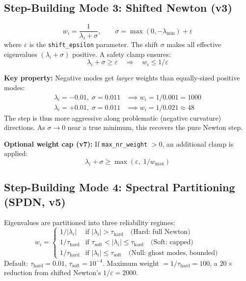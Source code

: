 \documentclass[11pt,a4paper]{article}
\newcommand{\eval}{\lambda}
\begin{document}
\subsection{Step-Building Mode 3: Shifted Newton (v3)}
\label{sec:shifted-newton}

\begin{equation}
  w_i = \frac{1}{\eval_i + \sigma}, \qquad \sigma = \max(0, -\eval_\text{min}) + \varepsilon
  \label{eq:shifted-newton}
\end{equation}
where $\varepsilon$ is the \texttt{shift\_epsilon} parameter. The shift $\sigma$ makes all effective eigenvalues $(\eval_i + \sigma)$ positive. A safety clamp ensures:
\begin{equation}
  \eval_i + \sigma \geq \varepsilon \quad \Rightarrow \quad w_i \leq 1/\varepsilon
\end{equation}

\textbf{Key property:} Negative modes get \emph{larger} weights than equally-sized positive modes:
\begin{align}
  \eval_i = -0.01,\; \sigma = 0.011 &\implies w_i = 1/0.001 = 1000 \\
  \eval_i = +0.01,\; \sigma = 0.011 &\implies w_i = 1/0.021 \approx 48
\end{align}
The step is thus more aggressive along problematic (negative curvature) directions. As $\sigma \to 0$ near a true minimum, this recovers the pure Newton step.

\textbf{Optional weight cap (v7):} If \texttt{max\_nr\_weight} $> 0$, an additional clamp is applied:
\begin{equation}
  \eval_i + \sigma \geq \max\left(\varepsilon,\; 1/w_\text{max}\right)
\end{equation}

\subsection{Step-Building Mode 4: Spectral Partitioning (SPDN, v5)}
\label{sec:spdn-step}

Eigenvalues are partitioned into three reliability regimes:
\begin{equation}
  w_i = \begin{cases}
    1/|\eval_i| & \text{if } |\eval_i| > \tau_\text{hard} \quad \text{(Hard: full Newton)} \\
    1/\tau_\text{hard} & \text{if } \tau_\text{soft} < |\eval_i| \leq \tau_\text{hard} \quad \text{(Soft: capped)} \\
    1/\tau_\text{hard} & \text{if } |\eval_i| \leq \tau_\text{soft} \quad \text{(Null: ghost modes, bounded)}
  \end{cases}
  \label{eq:spdn-weight}
\end{equation}
Default: $\tau_\text{hard} = 0.01$, $\tau_\text{soft} = 10^{-4}$. Maximum weight $= 1/\tau_\text{hard} = 100$, a $20\times$ reduction from shifted Newton's $1/\varepsilon = 2000$.
\end{document}
